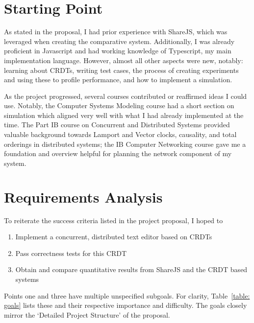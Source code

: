 \documentclass[12pt,a4paper,twoside,openright]{report}
\begin{document}
\section{Starting Point}

As stated in the proposal, I had prior experience with ShareJS, which was leveraged when creating the comparative system. Additionally, I was already proficient in Javascript and had working knowledge of Typescript, my main implementation language. However, almost all other aspects were new, notably: learning about CRDTs, writing test cases, the process of creating experiments and using these to profile performance, and how to implement a simulation.

As the project progressed, several courses contributed or reaffirmed ideas I could use. Notably, the Computer Systems Modeling \cite{compsysmodeling} course had a short section on simulation which aligned very well with what I had already implemented at the time. The Part IB course on Concurrent and Distributed Systems \cite{concdistsystems} provided valuable background towards Lamport and Vector clocks, causality, and total orderings in distributed systems; the IB Computer Networking course \cite{computernetworking} gave me a foundation and overview helpful for planning the network component of my system.



\section{Requirements Analysis}
To reiterate the success criteria listed in the project proposal, I hoped to

\begin{enumerate}
\item Implement a concurrent, distributed text editor based on CRDTs 
\item Pass correctness tests for this CRDT
\item Obtain and compare quantitative results from ShareJS and the CRDT based systems
\end{enumerate}

Points one and three have multiple unspecified subgoals. For clarity, Table~\ref{table: goals} lists these and their respective importance and difficulty. The goals closely mirror the `Detailed Project Structure' of the proposal.
\end{document}
